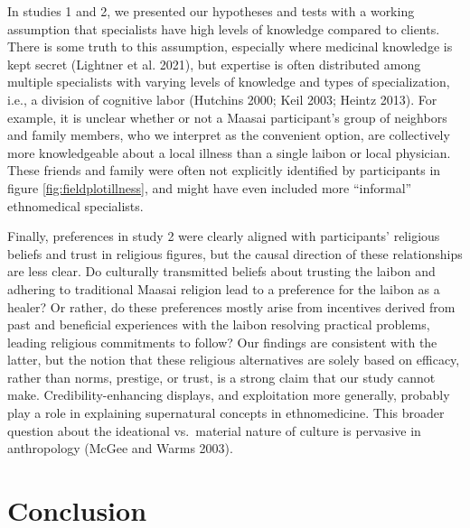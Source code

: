 \documentclass[
  11pt,
]{article}
\begin{document}
In studies 1 and 2, we presented our hypotheses and tests with a working assumption that specialists have high levels of knowledge compared to clients. There is some truth to this assumption, especially where medicinal knowledge is kept secret (Lightner et al. 2021), but expertise is often distributed among multiple specialists with varying levels of knowledge and types of specialization, i.e., a division of cognitive labor (Hutchins 2000; Keil 2003; Heintz 2013). For example, it is unclear whether or not a Maasai participant's group of neighbors and family members, who we interpret as the convenient option, are collectively more knowledgeable about a local illness than a single laibon or local physician. These friends and family were often not explicitly identified by participants in figure \ref{fig:fieldplotillness}, and might have even included more ``informal'' ethnomedical specialists.

Finally, preferences in study 2 were clearly aligned with participants' religious beliefs and trust in religious figures, but the causal direction of these relationships are less clear. Do culturally transmitted beliefs about trusting the laibon and adhering to traditional Maasai religion lead to a preference for the laibon as a healer? Or rather, do these preferences mostly arise from incentives derived from past and beneficial experiences with the laibon resolving practical problems, leading religious commitments to follow? Our findings are consistent with the latter, but the notion that these religious alternatives are solely based on efficacy, rather than norms, prestige, or trust, is a strong claim that our study cannot make. Credibility-enhancing displays, and exploitation more generally, probably play a role in explaining supernatural concepts in ethnomedicine. This broader question about the ideational vs.~material nature of culture is pervasive in anthropology (McGee and Warms 2003).

\hypertarget{conclusion}{%
\section{Conclusion}\label{conclusion}}
\end{document}
